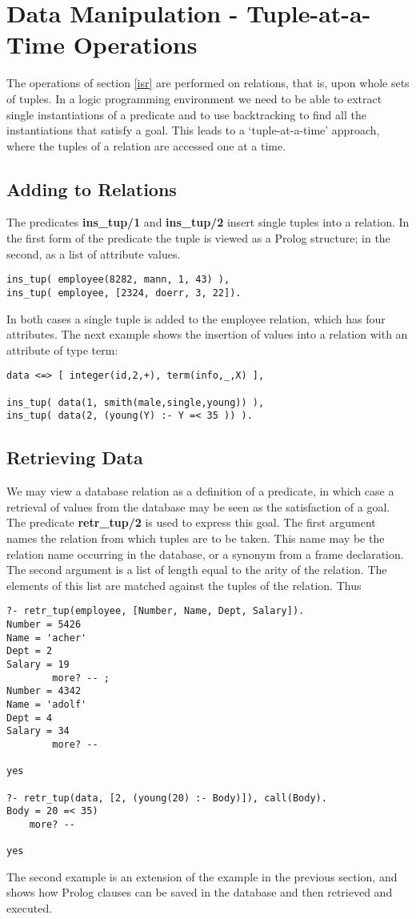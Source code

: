 \section{Data Manipulation - Tuple-at-a-Time Operations}
The operations of section \ref{isr} are performed on relations, that
is, upon whole sets of tuples. In a logic programming environment 
we need to be able to extract single instantiations of a predicate and to
use backtracking to find all the instantiations that satisfy a goal.
This leads to a `tuple-at-a-time'
approach, where the tuples of a relation are accessed one at a 
time.  

\subsection{Adding to Relations}
The predicates {\bf ins\_tup/1} and {\bf ins\_tup/2} insert single
tuples into a relation. In the first form of the predicate the
tuple is viewed as a Prolog structure; in the second, as a list
of attribute values.
\begin{verbatim}
ins_tup( employee(8282, mann, 1, 43) ),
ins_tup( employee, [2324, doerr, 3, 22]).
\end{verbatim}
In both cases a single tuple is added to the employee relation,
which has four attributes. The next example shows the insertion
of values into a relation with an attribute of type term:
\begin{verbatim}
data <=> [ integer(id,2,+), term(info,_,X) ],

ins_tup( data(1, smith(male,single,young)) ),
ins_tup( data(2, (young(Y) :- Y =< 35 )) ).
\end{verbatim}
    
\subsection{Retrieving Data}
We may view a database relation as a definition of a predicate,
in which case a retrieval of values from the database may be seen
as the satisfaction of a goal. The predicate {\bf retr\_\/tup/2} 
is used to express this goal. The first argument names the relation from which
tuples are to be taken. This name may be the relation name occurring
in the database, or a synonym from a frame declaration. 
The second argument is a list of length equal 
to the arity of the relation. The elements of this list are matched
against the tuples of the relation. Thus
\begin{verbatim}
?- retr_tup(employee, [Number, Name, Dept, Salary]).
Number = 5426
Name = 'acher'
Dept = 2
Salary = 19
        more? -- ;
Number = 4342
Name = 'adolf'
Dept = 4
Salary = 34
        more? -- 

yes

?- retr_tup(data, [2, (young(20) :- Body)]), call(Body).
Body = 20 =< 35)
	more? -- 

yes
\end{verbatim}
The second example is an extension of the example in the previous section, 
and shows how Prolog clauses can be saved in the database and then
retrieved and executed.

